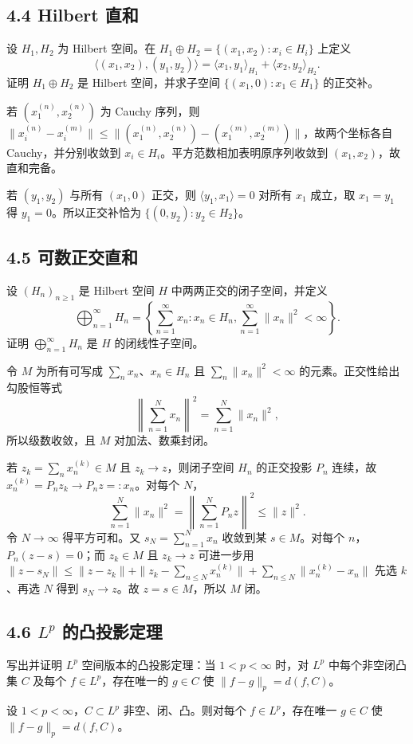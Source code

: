 \subsection*{4.4 Hilbert 直和}
\begin{problem}
设 $H_1,H_2$ 为 Hilbert 空间。在
$H_1\oplus H_2=\{(x_1,x_2):x_i\in H_i\}$ 上定义
\[
\langle(x_1,x_2),(y_1,y_2)\rangle
=\langle x_1,y_1\rangle_{H_1}+\langle x_2,y_2\rangle_{H_2}.
\]
证明 $H_1\oplus H_2$ 是 Hilbert 空间，并求子空间 $\{(x_1,0):x_1\in H_1\}$ 的正交补。
\end{problem}
若 $(x_1^{(n)},x_2^{(n)})$ 为 Cauchy 序列，则
$\|x_i^{(n)}-x_i^{(m)}\|\le\|(x_1^{(n)},x_2^{(n)})-(x_1^{(m)},x_2^{(m)})\|$，故两个坐标各自 Cauchy，并分别收敛到 $x_i\in H_i$。平方范数相加表明原序列收敛到 $(x_1,x_2)$，故直和完备。

若 $(y_1,y_2)$ 与所有 $(x_1,0)$ 正交，则 $\langle y_1,x_1\rangle=0$ 对所有 $x_1$ 成立，取 $x_1=y_1$ 得 $y_1=0$。所以正交补恰为 $\{(0,y_2):y_2\in H_2\}$。

\subsection*{4.5 可数正交直和}
\begin{problem}
设 $(H_n)_{n\ge1}$ 是 Hilbert 空间 $H$ 中两两正交的闭子空间，并定义
\[
\bigoplus_{n=1}^\infty H_n
=\left\{\sum_{n=1}^\infty x_n:x_n\in H_n, 
\sum_{n=1}^\infty\|x_n\|^2<\infty\right\}.
\]
证明 $\bigoplus_{n=1}^\infty H_n$ 是 $H$ 的闭线性子空间。
\end{problem}
令 $M$ 为所有可写成 $\sum_nx_n$、$x_n\in H_n$ 且 $\sum_n\|x_n\|^2<\infty$ 的元素。正交性给出勾股恒等式
\[
\left\|\sum_{n=1}^Nx_n\right\|^2=\sum_{n=1}^N\|x_n\|^2,
\]
所以级数收敛，且 $M$ 对加法、数乘封闭。

若 $z_k=\sum_nx_n^{(k)}\in M$ 且 $z_k\to z$，则闭子空间 $H_n$ 的正交投影 $P_n$ 连续，故
$x_n^{(k)}=P_nz_k\to P_nz=:x_n$。对每个 $N$，
\[
\sum_{n=1}^N\|x_n\|^2=\left\|\sum_{n=1}^NP_nz\right\|^2\le\|z\|^2.
\]
令 $N\to\infty$ 得平方可和。又 $s_N=\sum_{n=1}^Nx_n$ 收敛到某 $s\in M$。对每个 $n$，$P_n(z-s)=0$；而 $z_k\in M$ 且 $z_k\to z$ 可进一步用
$\|z-s_N\|\le\|z-z_k\|+\|z_k-\sum_{n\le N}x_n^{(k)}\|+\sum_{n\le N}\|x_n^{(k)}-x_n\|$
先选 $k$、再选 $N$ 得到 $s_N\to z$。故 $z=s\in M$，所以 $M$ 闭。

\subsection*{4.6 $L^p$ 的凸投影定理}
\begin{problem}
写出并证明 $L^p$ 空间版本的凸投影定理：当 $1<p<\infty$ 时，对 $L^p$ 中每个非空闭凸集 $C$ 及每个 $f\in L^p$，存在唯一的 $g\in C$ 使 $\|f-g\|_p=d(f,C)$。
\end{problem}
设 $1<p<\infty$，$C\subset L^p$ 非空、闭、凸。则对每个 $f\in L^p$，存在唯一 $g\in C$ 使
$\|f-g\|_p=d(f,C)$。

